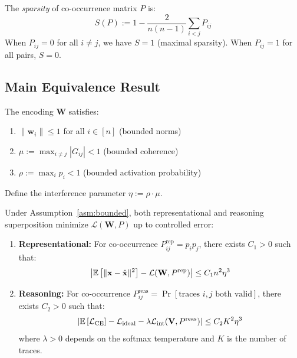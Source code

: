 \begin{definition}
\label{def:sparsity}
The \emph{sparsity} of co-occurrence matrix $P$ is:
\begin{equation}
S(P) := 1 - \frac{2}{n(n-1)} \sum_{i < j} P_{ij}
\end{equation}
When $P_{ij} = 0$ for all $i \neq j$, we have $S = 1$ (maximal sparsity). When $P_{ij} = 1$ for all pairs, $S = 0$.
\end{definition}

\subsection{Main Equivalence Result}

\begin{assumption}
\label{asm:bounded}
The encoding $\mathbf{W}$ satisfies:
\begin{enumerate}
    \item[(i)] $\|\mathbf{w}_i\| \leq 1$ for all $i \in [n]$ (bounded norms)
    \item[(ii)] $\mu := \max_{i \neq j} |G_{ij}| < 1$ (bounded coherence)
    \item[(iii)] $\rho := \max_i p_i < 1$ (bounded activation probability)
\end{enumerate}
Define the interference parameter $\eta := \rho \cdot \mu$.
\end{assumption}

\begin{theorem}
\label{thm:equivalence}
Under Assumption~\ref{asm:bounded}, both representational and reasoning superposition minimize $\mathcal{L}(\mathbf{W}, P)$ up to controlled error:
\begin{enumerate}
    \item[(a)] \textbf{Representational:} For co-occurrence $P^{\text{rep}}_{ij} = p_i p_j$, there exists $C_1 > 0$ such that:
    \begin{equation}
    \left| \mathbb{E}\left[\|\mathbf{x} - \hat{\mathbf{x}}\|^2\right] - \mathcal{L}(\mathbf{W}, P^{\text{rep}}) \right| \leq C_1 n^2 \eta^3
    \end{equation}

    \item[(b)] \textbf{Reasoning:} For co-occurrence $P^{\text{reas}}_{ij} = \Pr[\text{traces } i, j \text{ both valid}]$, there exists $C_2 > 0$ such that:
    \begin{equation}
    \left| \mathbb{E}\left[\mathcal{L}_{\text{CE}}\right] - \mathcal{L}_{\text{ideal}} - \lambda \mathcal{L}_{\text{int}}(\mathbf{V}, P^{\text{reas}}) \right| \leq C_2 K^2 \eta^3
    \end{equation}
    where $\lambda > 0$ depends on the softmax temperature and $K$ is the number of traces.
\end{enumerate}
\end{theorem}

